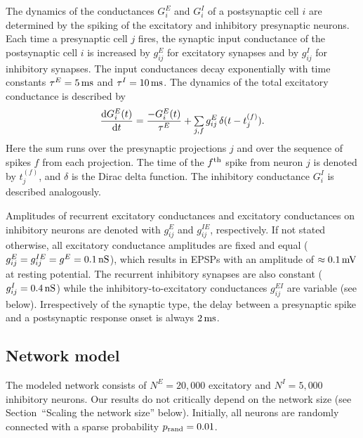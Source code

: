     The dynamics of the conductances $G_i^E$ and $G_i^I$ of a postsynaptic cell
    $i$ are determined by the spiking of the excitatory and inhibitory
    presynaptic neurons. Each time a presynaptic cell $j$ fires, the synaptic
    input conductance of the postsynaptic cell $i$ is increased by $g_{ij}^E$
    for excitatory synapses and by $g_{ij}^I$ for inhibitory synapses. The
    input conductances decay exponentially with time constants $\tau^E = 5\,
    {\rm ms}$ and $\tau^I = 10\, {\rm ms}$. The dynamics of the total
    excitatory conductance is described by
    \begin{equation}
      \frac{{\rm d} G_i^E(t)}{{\rm d} t} = \frac{-G_i^E(t)}{\tau^E} + \sum_{j,f} g_{ij}^{E} \, \delta(t-t_{j}^{(f)}) .
      \label{eq:conductance}
    \end{equation}
    Here the sum runs over the presynaptic projections $j$ and over the
    sequence of spikes $f$ from each projection. The time of the $f^{\rm th}$
    spike from neuron $j$ is denoted by $t_{j}^{(f)}$, and $\delta$ is the
    Dirac delta function. The inhibitory conductance $G^I_i$ is described
    analogously.
  
    Amplitudes of recurrent excitatory conductances and excitatory conductances
    on inhibitory neurons are denoted with $g_{ij}^E$ and $g_{ij}^{IE}$,
    respectively. If not stated otherwise, all excitatory conductance
    amplitudes are fixed and equal ($g_{ij}^E = g_{ij}^{IE} = g^E = 0.1\, {\rm
    nS}$), which results in EPSPs with an amplitude of $\approx 0.1\, {\rm mV}$
    at resting potential. The recurrent inhibitory synapses are also constant
    ($g_{ij}^I =0.4\, {\rm nS}$) while the inhibitory-to-excitatory
    conductances $g_{ij}^{EI}$ are variable (see below). Irrespectively of the
    synaptic type, the delay between a presynaptic spike and a postsynaptic
    response onset is always $2\, {\rm ms}$.

  \subsection{Network model}
    The modeled network consists of $N^E=20,000$ excitatory and $N^I=5,000$
    inhibitory neurons.  Our results do not critically depend on the network
    size (see Section~``Scaling the network size'' below).  Initially, all
    neurons are randomly connected with a sparse probability $p_{\rm
    rand}=0.01$.

